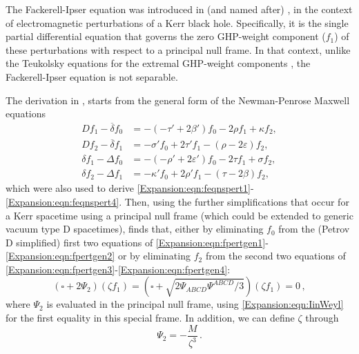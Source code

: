 	The Fackerell-Ipser equation was introduced in (and named after) \cite{Fackerell:1972hg}, in the context of electromagnetic perturbations of a Kerr black hole. Specifically, it is the single partial differential equation that governs the zero GHP-weight component ($f_1$) of these perturbations with respect to a principal null frame. In that context, unlike the Teukolsky equations for the extremal GHP-weight components \cite{Teukolsky:1973ha}, the Fackerell-Ipser equation is not separable.
	
	The derivation in \cite{Fackerell:1972hg}, starts from the general form of the Newman-Penrose Maxwell equations
	\begin{align}
	D f_{1} - \overline{\delta} f_{0} &= -\left(-\tau' + 2 \beta'\right) f_{0} - 2 \rho f_{1} + \kappa f_{2}, \label{Expansion:eqn:fpertgen1}\\
	D f_{2} - \overline{\delta} f_{1} &= -\sigma' f_{0} + 2 \tau' f_{1} - \left(\rho - 2 \varepsilon\right) f_{2}, \label{Expansion:eqn:fpertgen2} \\
	\delta f_{1} - \Delta f_{0} &= -\left(-\rho' + 2 \varepsilon' \right) f_{0} - 2 \tau f_{1} + \sigma f_{2}, \label{Expansion:eqn:fpertgen3} \\
	\delta f_{2} - \Delta f_{1} &= -\kappa' f_{0}  + 2 \rho' f_{1} - \left(\tau - 2 \beta\right) f_{2}, \label{Expansion:eqn:fpertgen4}
	\end{align}
	which were also used to derive \eqref{Expansion:eqn:feqnspert1}-\eqref{Expansion:eqn:feqnspert4}. Then, using the further simplifications that occur for a Kerr spacetime using a principal null frame (which could be extended to generic vacuum type D spacetimes), \cite{Fackerell:1972hg} finds that, either by eliminating $f_{0}$ from the (Petrov D simplified) first two equations of \eqref{Expansion:eqn:fpertgen1}-\eqref{Expansion:eqn:fpertgen2} or by eliminating $f_{2}$ from the second two equations of \eqref{Expansion:eqn:fpertgen3}-\eqref{Expansion:eqn:fpertgen4}:
	\begin{equation}\label{Expansion:eqn:FIequation}
	\left(\square  + 2 \Psi_2 \right) (\zeta f_1) = \left(\square  +  \sqrt{2\Psi_{ABCD} \Psi^{ABCD}/3} \right) (\zeta f_1)   = 0\, ,
	\end{equation}
	where $\Psi_2$ is evaluated in the principal null frame, using \eqref{Expansion:eqn:IinWeyl} for the first equality in this special frame. In addition, we can define $\zeta$ through 
	\begin{equation}
	\Psi_2 = -\frac{M}{\zeta^3} \, .
	\end{equation}
